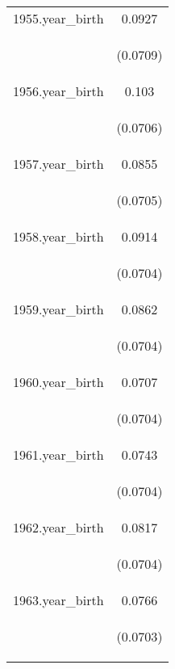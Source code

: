 \documentclass[]{article}
\begin{document}
\begin{center}
\begin{tabular}{lc}
1955.year\_birth & 0.0927 \\
\vspace{4pt} & \begin{footnotesize}(0.0709)\end{footnotesize} \\
1956.year\_birth & 0.103 \\
\vspace{4pt} & \begin{footnotesize}(0.0706)\end{footnotesize} \\
1957.year\_birth & 0.0855 \\
\vspace{4pt} & \begin{footnotesize}(0.0705)\end{footnotesize} \\
1958.year\_birth & 0.0914 \\
\vspace{4pt} & \begin{footnotesize}(0.0704)\end{footnotesize} \\
1959.year\_birth & 0.0862 \\
\vspace{4pt} & \begin{footnotesize}(0.0704)\end{footnotesize} \\
1960.year\_birth & 0.0707 \\
\vspace{4pt} & \begin{footnotesize}(0.0704)\end{footnotesize} \\
1961.year\_birth & 0.0743 \\
\vspace{4pt} & \begin{footnotesize}(0.0704)\end{footnotesize} \\
1962.year\_birth & 0.0817 \\
\vspace{4pt} & \begin{footnotesize}(0.0704)\end{footnotesize} \\
1963.year\_birth & 0.0766 \\
\vspace{4pt} & \begin{footnotesize}(0.0703)\end{footnotesize} \\

\end{tabular}
\end{center}
\end{document}
